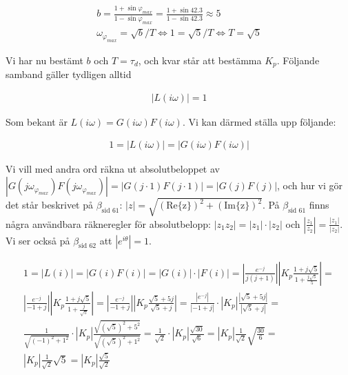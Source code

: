 \documentclass[a4paper]{article}
\newcommand{\mhb}[1]{$\beta_{\text{#1}}$}     %
\newcommand{\oklarhet}[1]{%
  \noindent\fbox{\parbox[b][4em][t]{\textwidth}{\color{red}#1} }%
}
\begin{document}
\begin{align*}
  b = \frac{1 + \sin \varphi_{max}}{1 - \sin \varphi_{max}} = \frac{1 + \sin 42.3}{1 - \sin 42.3} \approx 5\\
  \omega_{\varphi_{max}} = \sqrt{b}/T \Longleftrightarrow 1 = \sqrt{5}/T \Longleftrightarrow T = \sqrt{5}
\end{align*}

Vi har nu bestämt $b$ och $T = \tau_d$, och kvar står att bestämma $K_p$. Följande samband gäller tydligen alltid\\
\oklarhet{Referens?}

\begin{align*}
  |L(i\omega)| = 1
\end{align*}

Som bekant är $L(i\omega) = G(i\omega)F(i\omega)$. Vi kan därmed ställa upp följande:

\begin{align*}
  1 = |L(i\omega)| = |G(i\omega)F(i\omega)|
\end{align*}

Vi vill med andra ord räkna ut absolutbeloppet av $|G(j\omega_{\varphi_{max}})F(j\omega_{\varphi_{max}})| = |G(j\cdot1)F(j\cdot1)| = |G(j)F(j)|$, och hur vi gör det står beskrivet på \mhb{sid 61}: $|z| = \sqrt{(\text{Re\{z\}})^2 + (\text{Im\{z\}})^2}$. På \mhb{sid 61} finns några användbara räkneregler för absolutbelopp: $|z_1 z_2| = |z_1|\cdot |z_2|$ och $\left|\frac{z_1}{z_2}\right| = \frac{|z_1|}{|z_2|}$. Vi ser också på \mhb{sid 62} att $|e^{i\theta}| = 1$.


\begin{align*}
  1 = |L(i)| = |G(i)F(i)| = |G(i)|\cdot|F(i)| = \left | \frac{e^{-j}}{j(j+1)} \right | \left | K_p\frac{1+j\sqrt{5}}{1 + \frac{j \sqrt{5}}{5}} \right | = \\
  \left | \frac{e^{-j}}{-1+j} \right | \left | K_p\frac{1+j\sqrt{5}}{1 + \frac{j}{\sqrt{5}}} \right | =
  \left | \frac{e^{-j}}{-1+j} \right | \left | K_p\frac{\sqrt{5}+5j}{\sqrt{5} + j} \right | =
  \frac{|e^{-j}|}{|-1+j|} \cdot |K_p| \frac{|\sqrt{5}+5j|}{|\sqrt{5} + j|} = \\
  \frac{1}{\sqrt{(-1)^2 + 1^2}} \cdot |K_p| \frac{\sqrt{(\sqrt{5})^2 + 5^2}}{\sqrt{(\sqrt{5})^2 + 1^2}} =
  \frac{1}{\sqrt{2}} \cdot |K_p| \frac{\sqrt{30}}{\sqrt{6}} =
  |K_p| \frac{1}{\sqrt{2}} \sqrt{\frac{30}{6}} = \\
  |K_p| \frac{1}{\sqrt{2}} \sqrt{5} =
  |K_p| \frac{\sqrt{5}}{\sqrt{2}}
\end{align*}
\end{document}
